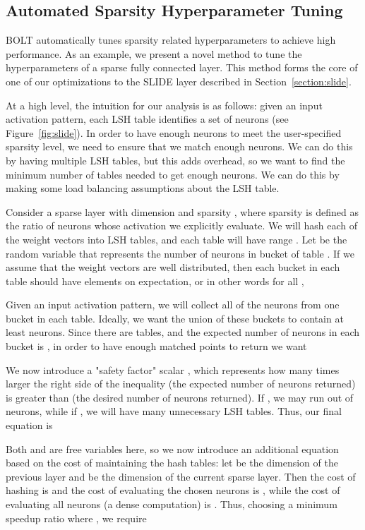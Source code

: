 \documentclass[sigconf]{acmart}
\begin{document}
\subsection{Automated Sparsity Hyperparameter Tuning}

BOLT automatically tunes sparsity related hyperparameters to achieve high performance. As an example, we present a novel method to tune the hyperparameters of a sparse fully connected layer. This method forms the core of one of our optimizations to the SLIDE layer described in Section~\ref{section:slide}. 

At a high level, the intuition for our analysis is as follows: given an input activation pattern, each LSH table identifies a set of neurons (see Figure~\ref{fig:slide}). In order to have enough neurons to meet the user-specified sparsity level, we need to ensure that we match enough neurons. We can do this by having multiple LSH tables, but this adds overhead, so we want to find the minimum number of tables needed to get enough neurons. We can do this by making some load balancing assumptions about the LSH table. 

Consider a sparse layer with dimension  and sparsity , where sparsity is defined as the ratio of neurons whose activation we explicitly evaluate. We will hash each of the  weight vectors into  LSH tables, and each table will have range . Let  be the random variable that represents the number of neurons in bucket  of table . If we assume that the weight vectors are well distributed, then each bucket in each table should have  elements on expectation, or in other words for all ,

Given an input activation pattern, we will collect all of the neurons from one bucket in each table. Ideally, we want the union of these buckets to contain at least  neurons. Since there are  tables, and the expected number of neurons in each bucket is , in order to have enough matched points to return we want

We now introduce a "safety factor" scalar , which represents how many times larger the right side of the inequality (the expected number of neurons returned) is greater than  (the desired number of neurons returned). If , we may run out of neurons, while if , we will have many unnecessary LSH tables. Thus, our final equation is

Both  and  are free variables here, so we now introduce an additional equation based on the cost of maintaining the hash tables: let  be the dimension of the previous layer and  be the dimension of the current sparse layer. Then the cost of hashing is  and the cost of evaluating the chosen neurons is , while the cost of evaluating all neurons (a dense computation) is . Thus, choosing a minimum speedup ratio  where , we require 
 
\end{document}
